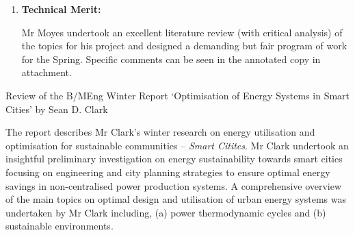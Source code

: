 \documentclass[14pt,twoside]{report}
\begin{document}
\begin{enumerate}
\begin{enumerate}
                   The literature review undertaken in this report was very thorough {\it wrt} geothermal systems, exergy balance and  technoeconomics analys, but limited on the energy integration part;
                   \item The work plan is appropriate for the project and seems realistic;
                \end{enumerate}
%
    \item {\bf Technical Merit:}

                    Mr Moyes undertook an excellent literature review (with critical analysis) of the topics for his project and designed a demanding but fair program of work for the Spring. Specific comments can be seen in the annotated copy in attachment.
%
\end{enumerate}

\clearpage





\bigskip

\begin{center}
  {\Large Review of the B/MEng Winter Report `Optimisation of Energy Systems in Smart Cities' by Sean D. Clark}
\end{center}

The report describes Mr Clark's winter research on energy utilisation and optimisation for sustainable communities -- {\it Smart Citites}. Mr Clark undertook an insightful preliminary investigation on energy sustainability towards smart cities focusing on engineering and city planning strategies to ensure optimal energy savings in non-centralised power production systems. A comprehensive overview of the main topics on optimal design and utilisation of urban energy systems was undertaken by Mr Clark including, (a) power thermodynamic cycles and (b) sustainable environments.  
\end{document}
